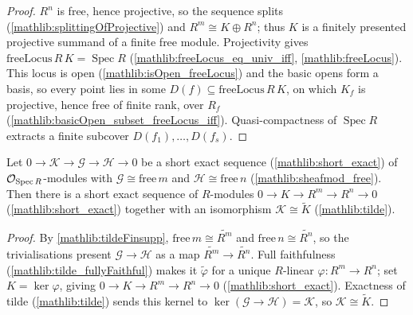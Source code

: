 \begin{proof}
  \leanok
  \(R^n\) is free, hence projective, so the sequence splits
  (\cref{mathlib:splittingOfProjective}) and \(R^m\cong K\oplus R^n\); thus \(K\) is a
  finitely presented projective summand of a finite free module.  Projectivity gives
  \(\mathrm{freeLocus}\,R\,K=\operatorname{Spec}R\)
  (\cref{mathlib:freeLocus_eq_univ_iff}, \cref{mathlib:freeLocus}).  This locus is
  open (\cref{mathlib:isOpen_freeLocus}) and the basic opens form a basis, so every
  point lies in some \(D(f)\subseteq\mathrm{freeLocus}\,R\,K\), on which \(K_f\) is
  projective, hence free of finite rank, over \(R_f\)
  (\cref{mathlib:basicOpen_subset_freeLocus_iff}).  Quasi-compactness of
  \(\operatorname{Spec}R\) extracts a finite subcover \(D(f_1),\dots,D(f_s)\).
\end{proof}

\begin{lemma}
  \label{lem:kernel_iso_tilde_affine}
  Let \(0\to\mathcal K\to\mathcal G\to\mathcal H\to 0\) be a short exact sequence
  (\cref{mathlib:short_exact}) of \(\mathcal{O}_{\operatorname{Spec}R}\)-modules with
  \(\mathcal G\cong\mathrm{free}\,m\) and \(\mathcal H\cong\mathrm{free}\,n\)
  (\cref{mathlib:sheafmod_free}).  Then there is a short exact sequence of
  \(R\)-modules \(0\to K\to R^m\to R^n\to 0\) (\cref{mathlib:short_exact}) together
  with an isomorphism \(\mathcal K\cong\widetilde K\) (\cref{mathlib:tilde}).
\end{lemma}

\begin{proof}
  By \cref{mathlib:tildeFinsupp}, \(\mathrm{free}\,m\cong\widetilde{R^m}\) and
  \(\mathrm{free}\,n\cong\widetilde{R^n}\), so the trivialisations present
  \(\mathcal G\to\mathcal H\) as a map \(\widetilde{R^m}\to\widetilde{R^n}\).  Full
  faithfulness (\cref{mathlib:tilde_fullyFaithful}) makes it \(\widetilde\varphi\)
  for a unique \(R\)-linear \(\varphi:R^m\to R^n\); set \(K=\ker\varphi\), giving
  \(0\to K\to R^m\to R^n\to 0\) (\cref{mathlib:short_exact}).  Exactness of tilde
  (\cref{mathlib:tilde}) sends this kernel to \(\ker(\mathcal G\to\mathcal H)=
  \mathcal K\), so \(\mathcal K\cong\widetilde K\).
\end{proof}

